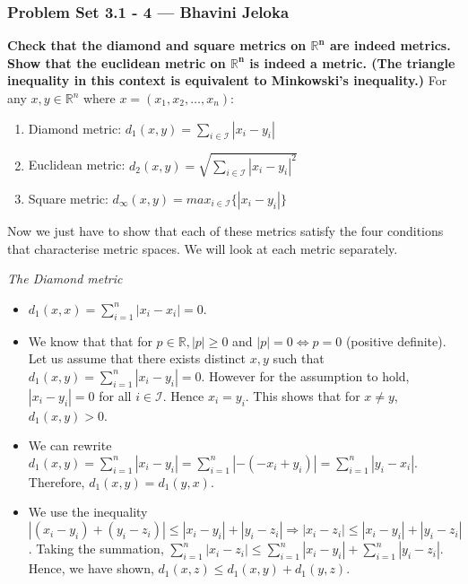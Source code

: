 \begin{frame}{}
\frametitle{Problem Set 3.1 - 4 --- Bhavini Jeloka}
\textbf{Check that the diamond and square metrics on $\bm{\mathbb{R}^n}$ are
indeed metrics. Show that the euclidean metric on $\bm{\mathbb{R}^n}$ is indeed
a metric. (The triangle inequality in this context is equivalent to Minkowski’s
inequality.)}\hfill\break
\hfill\break
For any ${x},{y} \in \mathbb{R}^n $ where $x = (x_1, x_2, \ldots,x_n)$: 
\begin{enumerate}
    \item Diamond metric: $d_1({x},{y}) = \sum_{i\in \mathcal{I}} |x_i - y_i| $
    \item Euclidean metric: $d_2({x},{y}) = \sqrt{\sum_{i\in \mathcal{I}} |x_i -
    y_i|^2} $
    \item Square metric: $d_{\infty}({x},{y}) = max_{i\in \mathcal{I}}\{|x_i -
    y_i|\}$
\end{enumerate}
\hfill\break
Now we just have to show that each of these metrics satisfy the four conditions
that characterise metric spaces. We will look at each metric separately.
\end{frame}

\begin{frame}
\textit{The Diamond metric}\hfill\break
\begin{itemize}
        \item $d_1(x,x) = \sum_{i=1}^{n} |x_i - x_i| = 0$.
        \hfill\break
    \pause
    \item  We know that that
    for $p \in \mathbb{R}, |p|\geq 0$ and $|p| = 0 \iff p = 0$ (positive
    definite). \hfill\break
    \hfill\break
    Let us assume that there exists distinct $x,y$ such that $d_1(x,y) = \sum_{i=1}^{n} |x_i - y_i| = 0$.\hfill\break
    \hfill\break
    However for the assumption to hold, $|x_i - y_i| = 0$ for all
    $i \in \mathcal{I}$. Hence $x_i = y_i$. This
    shows that for $x\neq y$, $d_1(x,y)>0$.
\end{itemize}
\end{frame}

\begin{frame}{}
\begin{itemize}
    \item We can rewrite $d_1(x,y) = \sum_{i=1}^{n} |x_i - y_i| = \sum_{i=1}^{n}
    |- (- x_i + y_i)| = \sum_{i=1}^{n} |y_i -
    x_i |.$ Therefore, $d_1(x,y) = d_1(y,x).$ \hfill\break
    \pause
    \item We use the inequality $|(x_i - y_i) + (y_i - z_i)| \leq |x_i -
    y_i| + |y_i - z_i| \Rightarrow |x_i - z_i| \leq |x_i - y_i| + |y_i - z_i|$.\hfill\break
    \hfill\break
    Taking the summation, $\sum_{i=1}^{n}|x_i - z_i| \leq \sum_{i=1}^{n}|x_i -
    y_i| + \sum_{i=1}^{n}|y_i - z_i|$. \\
    Hence, we have shown, $d_1(x,z) \leq
    d_1(x,y)+d_1(y,z).$
\end{itemize}
\end{frame}

